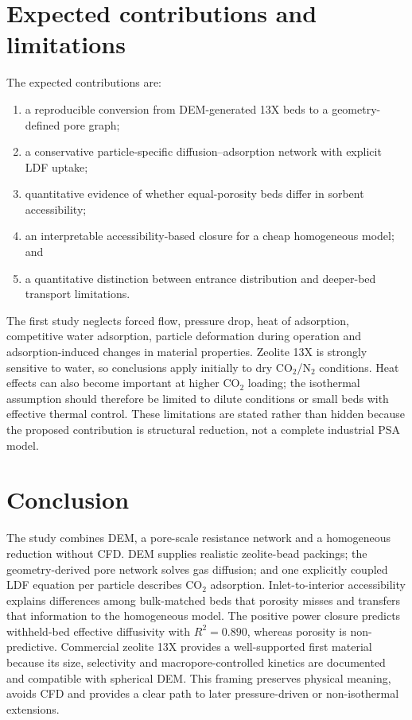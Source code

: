 \documentclass[12pt,a4paper]{article}
\begin{document}
\section{Expected contributions and limitations}

The expected contributions are:
\begin{enumerate}
 \item a reproducible conversion from DEM-generated 13X beds to a
 geometry-defined pore graph;
 \item a conservative particle-specific diffusion--adsorption network with
 explicit LDF uptake;
 \item quantitative evidence of whether equal-porosity beds differ in sorbent
 accessibility;
 \item an interpretable accessibility-based closure for a cheap homogeneous
 model; and
 \item a quantitative distinction between entrance distribution and deeper-bed
 transport limitations.
\end{enumerate}

The first study neglects forced flow, pressure drop, heat of adsorption,
competitive water adsorption, particle deformation during operation and
adsorption-induced changes in material properties. Zeolite 13X is strongly
sensitive to water, so conclusions apply initially to dry CO$_2$/N$_2$
conditions. Heat effects can also become important at higher CO$_2$ loading;
the isothermal assumption should therefore be limited to dilute conditions or
small beds with effective thermal control. These limitations are stated rather
than hidden because the proposed contribution is structural reduction, not a
complete industrial PSA model.

\section{Conclusion}

The study combines DEM, a pore-scale resistance network and a homogeneous
reduction without CFD. DEM supplies realistic zeolite-bead packings; the
geometry-derived pore network solves gas diffusion; and one explicitly coupled
LDF equation per particle describes CO$_2$ adsorption. Inlet-to-interior
accessibility explains differences among bulk-matched beds that porosity misses
and transfers that information to the homogeneous model. The positive power
closure predicts withheld-bed effective diffusivity with $R^2=0.890$, whereas
porosity is non-predictive. Commercial zeolite 13X provides a well-supported
first material because its size, selectivity and macropore-controlled kinetics
are documented and compatible with spherical DEM. This framing preserves
physical meaning, avoids CFD and provides a clear path to later pressure-driven
or non-isothermal extensions.
\end{document}
